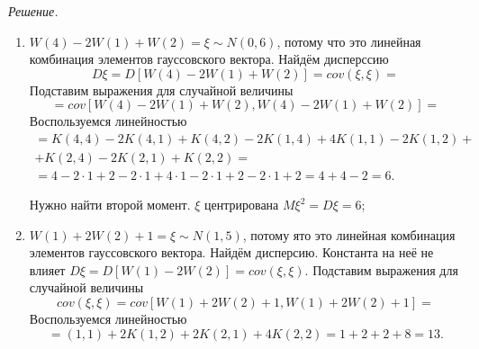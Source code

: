 \textit{Решение.}
\begin{enumerate}[label=\alph*)]
  \item $W \left( 4 \right) - 2W \left( 1 \right) + W \left( 2 \right) =
    \xi \sim
    N \left( 0, 6 \right) $,
  потому что это линейная комбинация элементов гауссовского вектора.
  Найдём дисперссию
  $$D \xi =
    D \left[ W \left( 4 \right) - 2W \left( 1 \right) + W \left( 2 \right) \right] =
    cov \left( \xi, \xi \right) =$$
  Подставим выражения для случайной величины
  $$= cov \left[
      W \left( 4 \right) - 2W \left( 1 \right) + W \left( 2 \right),
      W \left( 4 \right) - 2W \left( 1 \right) + W \left( 2 \right) \right] =$$
  Воспользуемся линейностью
  \begin{gather*}
    = K \left( 4, 4 \right) - 2K \left( 4, 1 \right) + K \left( 4, 2 \right) -
    2K \left( 1, 4 \right) + 4K \left( 1, 1 \right) - 2K \left( 1, 2 \right) + \\
    + K \left( 2, 4 \right) - 2K \left( 2, 1 \right) + K \left( 2, 2 \right) = \\
    = 4 - 2 \cdot 1 + 2 - 2 \cdot 1 + 4 \cdot 1 - 2 \cdot 1 + 2 - 2 \cdot 1 + 2 =
    4 + 4 - 2 =
    6.
  \end{gather*}

  Нужно найти второй момент.
  $ \xi $ центрирована $M \xi^2 = D \xi = 6$;
  \item $W \left( 1 \right) + 2W \left( 2 \right) + 1 =
    \xi \sim
    N \left( 1, 5 \right) $,
  потому ято это линейная комбинация элементов гауссовского вектора.
  Найдём дисперсию.
  Константа на неё не влияет
  $D \xi =
    D \left[ W \left( 1 \right) - 2W \left( 2 \right) \right] =
    cov \left( \xi, \xi \right) $.
  Подставим выражения для случайной величины
  $$cov \left( \xi, \xi \right) =
    cov \left[
      W \left( 1 \right) + 2W \left( 2 \right) + 1,
      W \left( 1 \right) + 2W \left( 2 \right) + 1 \right] =$$
  Воспользуемся линейностью
  $$= \left( 1, 1 \right) + 2K \left( 1, 2 \right) + 2K \left( 2, 1 \right) +
    4K \left( 2, 2 \right) =
    1 + 2 + 2 + 8 =
    13.$$


\end{enumerate}
